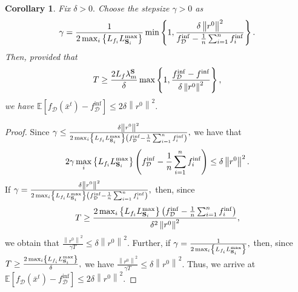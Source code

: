 \documentclass{article}
\newcommand{\bb}{\mathbb}
\newcommand{\norm}[1]{\left\| #1 \right\|}
\newcommand{\Exp}[1]{{\bb E}\left[#1\right]}
\theoremstyle{plain}
\newtheorem{corollary}{Corollary}
\newcommand{\tf}{f_{\mathcal{D}}}
\newcommand{\mS}{{\bf S}}
\theoremstyle{plain}
\theoremstyle{definition}
\theoremstyle{remark}
\begin{document}
\begin{corollary}
	Fix $\delta>0.$ Choose the stepsize $\gamma>0$ as
	\begin{equation*}
		\gamma = \frac{1}{2\max_i\left\lbrace L_{f_i}L_{\mS_i}^{\max} \right\rbrace}\min\left\lbrace 1, \frac{\delta\norm{r^0}^2}{\tf^{\inf} - \frac{1}{n}\sum_{i=1}^{n}f_i^{\inf}} \right\rbrace.
	\end{equation*}
	Then, provided that
	\begin{equation*}
		T\geq \frac{2L_f\lambda_m^{\mS}}{\delta}\max\left\lbrace 1, \frac{\tf^{\inf} - f^{\inf}}{\delta\norm{r^0}^2}\right\rbrace,
	\end{equation*}
	we have $\Exp{\tf(\bar{x}^t) - \tf^{\inf}}\leq 2\delta\norm{r^0}^2.$
\end{corollary}
\begin{proof}
	Since $\gamma\leq\frac{\delta\norm{r^0}^2}{2\max_i\left\lbrace L_{f_i}L_{\mS_i}^{\max} \right\rbrace\left(\tf^{\inf} - \frac{1}{n}\sum_{i=1}^{n}f_i^{\inf}\right)},$ we have that
	\begin{equation*}
		2\gamma\max_i\left\lbrace L_{f_i}L_{\mS_i}^{\max} \right\rbrace\left(\tf^{\inf} - \frac{1}{n}\sum_{i=1}^{n}f_i^{\inf}\right)\leq\delta\norm{r^0}^2.
	\end{equation*}
	If $\gamma = \frac{\delta\norm{r^0}^2}{2\max_i\left\lbrace L_{f_i}L_{\mS_i}^{\max} \right\rbrace\left(\tf^{\inf} - \frac{1}{n}\sum_{i=1}^{n}f_i^{\inf}\right)},$ then, since
	\begin{equation*}
		T \geq \frac{2\max_i\left\lbrace L_{f_i}L_{\mS_i}^{\max} \right\rbrace\left(\tf^{\inf} - \frac{1}{n}\sum_{i=1}^{n}f_i^{\inf}\right)}{\delta^2\norm{r^0}^2},
	\end{equation*}
	we obtain that $\frac{\norm{r^0}^2}{\gamma T}\leq \delta\norm{r^0}^2.$ Further, if $\gamma = \frac{1}{2\max_i\left\lbrace L_{f_i}L_{\mS_i}^{\max} \right\rbrace},$ then, since $T\geq \frac{2\max_i\left\lbrace L_{f_i}L_{\mS_i}^{\max} \right\rbrace}{\delta},$ we have $\frac{\norm{r^0}^2}{\gamma T}\leq\delta\norm{r^0}^2.$ Thus, we arrive at $\Exp{\tf(\bar{x}^t) - \tf^{\inf}}\leq 2\delta\left\|r^0\right\|^2.$
\end{proof}

\clearpage
\end{document}
